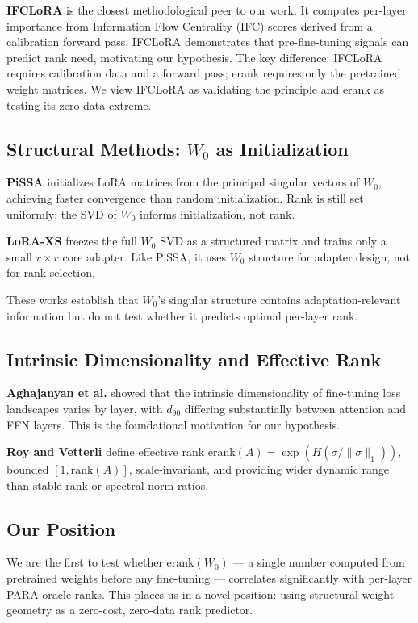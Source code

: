 \textbf{IFCLoRA} \cite{Zhang2026IFCLoRA} is the closest methodological peer to our work. It computes per-layer importance from Information Flow Centrality (IFC) scores derived from a calibration forward pass. IFCLoRA demonstrates that pre-fine-tuning signals can predict rank need, motivating our hypothesis. The key difference: IFCLoRA requires calibration data and a forward pass; erank requires only the pretrained weight matrices. We view IFCLoRA as validating the principle and erank as testing its zero-data extreme.

\subsection{Structural Methods: $W_0$ as Initialization}

\textbf{PiSSA} \cite{Meng2024PiSSA} initializes LoRA matrices from the principal singular vectors of $W_0$, achieving faster convergence than random initialization. Rank is still set uniformly; the SVD of $W_0$ informs initialization, not rank.

\textbf{LoRA-XS} \cite{Balazy2024LoRAXS} freezes the full $W_0$ SVD as a structured matrix and trains only a small $r \times r$ core adapter. Like PiSSA, it uses $W_0$ structure for adapter design, not for rank selection.

These works establish that $W_0$'s singular structure contains adaptation-relevant information but do not test whether it predicts optimal per-layer rank.

\subsection{Intrinsic Dimensionality and Effective Rank}

\textbf{Aghajanyan et al.} \cite{Aghajanyan2021Intrinsic} showed that the intrinsic dimensionality of fine-tuning loss landscapes varies by layer, with $d_{90}$ differing substantially between attention and FFN layers. This is the foundational motivation for our hypothesis.

\textbf{Roy and Vetterli} \cite{RoyVetterli2007EffectiveRank} define effective rank $\text{erank}(A) = \exp(H(\sigma/\|\sigma\|_1))$, bounded $[1, \text{rank}(A)]$, scale-invariant, and providing wider dynamic range than stable rank or spectral norm ratios.

\subsection{Our Position}

We are the first to test whether $\text{erank}(W_0)$ --- a single number computed from pretrained weights before any fine-tuning --- correlates significantly with per-layer PARA oracle ranks. This places us in a novel position: using structural weight geometry as a zero-cost, zero-data rank predictor.
